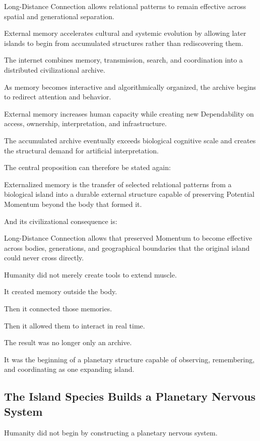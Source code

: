 Long-Distance Connection allows relational patterns to remain effective across spatial and generational separation.

External memory accelerates cultural and systemic evolution by allowing later islands to begin from accumulated structures rather than rediscovering them.

The internet combines memory, transmission, search, and coordination into a distributed civilizational archive.

As memory becomes interactive and algorithmically organized, the archive begins to redirect attention and behavior.

External memory increases human capacity while creating new Dependability on access, ownership, interpretation, and infrastructure.

The accumulated archive eventually exceeds biological cognitive scale and creates the structural demand for artificial interpretation.

The central proposition can therefore be stated again:

Externalized memory is the transfer of selected relational patterns from a biological island into a durable external structure capable of preserving Potential Momentum beyond the body that formed it.

And its civilizational consequence is:

Long-Distance Connection allows that preserved Momentum to become effective across bodies, generations, and geographical boundaries that the original island could never cross directly.

Humanity did not merely create tools to extend muscle.

It created memory outside the body.

Then it connected those memories.

Then it allowed them to interact in real time.

The result was no longer only an archive.

It was the beginning of a planetary structure capable of observing, remembering, and coordinating as one expanding island.

\subsection*{\textbf{The Island Species Builds a Planetary Nervous System}} 

Humanity did not begin by constructing a planetary nervous system.

